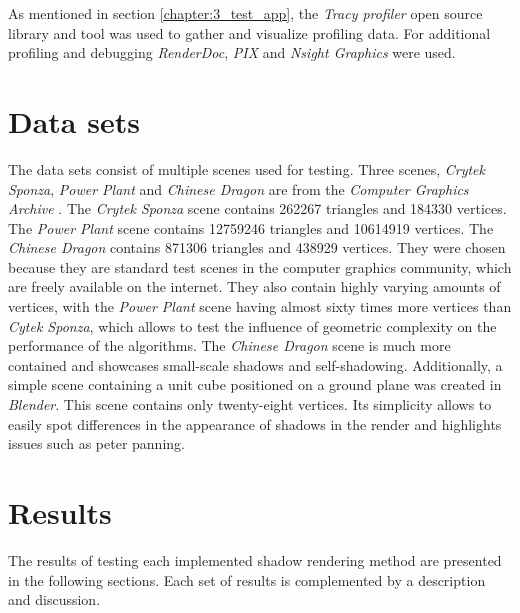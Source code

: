 As mentioned in section \ref{chapter:3_test_app}, the \textit{Tracy profiler} open source library and tool was used to gather and visualize profiling data. For additional profiling and debugging \textit{RenderDoc}, \textit{PIX} and \textit{Nsight Graphics} were used.

\section{Data sets}
The data sets consist of multiple scenes used for testing. Three scenes, \textit{Crytek Sponza}, \textit{Power Plant} and \textit{Chinese Dragon} are from the \textit{Computer Graphics Archive} \cite{bib:internet:test_scenes}. The \textit{Crytek Sponza} scene contains 262267 triangles and 184330 vertices. The \textit{Power Plant} scene contains 12759246 triangles and 10614919 vertices. The \textit{Chinese Dragon} contains 871306 triangles and 438929 vertices. They were chosen because they are standard test scenes in the computer graphics community, which are freely available on the internet. They also contain highly varying amounts of vertices, with the \textit{Power Plant} scene having almost sixty times more vertices than \textit{Cytek Sponza}, which allows to test the influence of geometric complexity on the performance of the algorithms. The \textit{Chinese Dragon} scene is much more contained and showcases small-scale shadows and self-shadowing. Additionally, a simple scene containing a unit cube positioned on a ground plane was created in \textit{Blender}. This scene contains only twenty-eight vertices. Its simplicity allows to easily spot differences in the appearance of shadows in the render and highlights issues such as peter panning.

\section{Results}

The results of testing each implemented shadow rendering method are presented in the following sections. Each set of results is complemented by a description and discussion.


